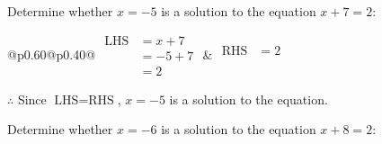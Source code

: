 \documentclass[12pt]{article}
\newcounter{minipagecount}
\begin{document}
\begin{multicols}{2}
\begin{minipage}[t]{0.40\textwidth}
    \noindent Determine whether \(x = -5\) is a solution to the equation \(x + 7 = 2\):
    \vspace{4pt}  %

    \noindent
    \renewcommand{\arraystretch}{1.3} %
    \begin{tabular}{@{}p{0.60\linewidth}@{}p{0.40\linewidth}@{}}
        \(\begin{aligned}
            \text{LHS} &= x + 7 \\
                    &= -5 + 7 \\
                    &= 2 
        \end{aligned}\) &
        \(\begin{aligned}
            \text{RHS} &= 2\\
                    & \\
                    &
        \end{aligned}\)
    \end{tabular}
    \renewcommand{\arraystretch}{1.0} %
    \vspace{2pt}  %

    \noindent \(\therefore\) Since \(\text{LHS} = \text{RHS}\), \(x = -5\) is  a solution to the equation.

\end{minipage}

 \vspace*{16pt}
\noindent{(\theminipagecount)}\hspace{0.1mm} %
\begin{minipage}[t]{0.40\textwidth} %

    \noindent Determine whether \(x = -6\) is a solution to the equation \(x + 8 = 2\):
    \vspace{4pt}  %


\end{minipage}
\end{multicols}
\end{document}
